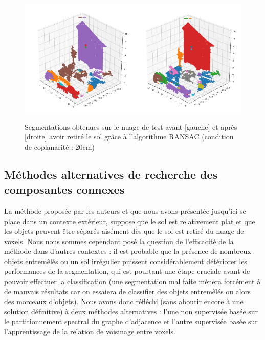 \documentclass[a4paper, onecolumn, 11pt]{article}
\begin{document}
\begin{figure}[h]
    \centering
    \includegraphics[width=0.5\textwidth]{fig/first_segmentation.png}\includegraphics[width=0.5\textwidth]{fig/second_segmentation.png}
    \caption{Segmentations obtenues sur le nuage de test avant [gauche] et après [droite] avoir retiré le sol grâce à l'algorithme RANSAC (condition de coplanarité : 20cm)}
    \label{fig:first_segmentations}
\end{figure}

\subsection{Méthodes alternatives de recherche des composantes connexes}
La méthode proposée par les auteurs et que nous avons présentée jusqu'ici se place dans un contexte extérieur, suppose que le sol est relativement plat et que les objets peuvent être séparés aisément dès que le sol est retiré du nuage de voxels. Nous nous sommes cependant posé la question de l'efficacité de la méthode dans d'autres contextes : il est probable que la présence de nombreux objets entremêlés ou un sol irrégulier puissent considérablement détériorer les performances de la segmentation, qui est pourtant une étape cruciale avant de pouvoir effectuer la classification (une segmentation mal faite mènera forcément à de mauvais résultats car on essaiera de classifier des objets entremêlés ou alors des morceaux d'objets). Nous avons donc réfléchi (sans aboutir encore à une solution définitive) à deux méthodes alternatives : l'une non supervisée basée sur le partitionnement spectral du graphe d'adjacence et l'autre supervisée basée sur l'apprentissage de la relation de voisinage entre voxels.
\end{document}
